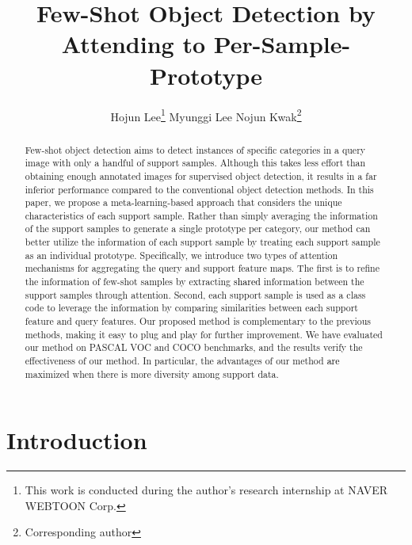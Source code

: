 \documentclass[10pt,twocolumn,letterpaper]{article}
\newcommand{\nj}[1]{\textcolor{black}{#1}}
\newcommand{\hj}[1]{\textcolor{black}{#1}}
\begin{document}
\title{Few-Shot Object Detection  by Attending to Per-Sample-Prototype}



\author[ ]{Hojun Lee\thanks{This work is conducted during the author’s research internship at NAVER WEBTOON Corp. \hspace{-0.5cm}} \:\: Myunggi Lee \:\: Nojun Kwak\thanks{Corresponding author}}


\maketitle


\begin{abstract} \vspace{-0.2cm}
Few-shot object detection aims to detect instances of specific categories in a query image with only a handful of support samples. Although this takes less effort than obtaining enough annotated images for supervised object detection, it results in a far inferior performance compared to the conventional object detection methods. In this paper, we propose a meta-learning-based approach that considers the unique characteristics of each support sample. 
Rather than simply averaging the information of the support samples to generate a single prototype per category, our method can better utilize the information of each support sample by treating each support sample as an individual prototype.
Specifically, we introduce two types of attention mechanisms for aggregating the query and support feature maps. The first is to refine the information of few-shot samples by extracting \nj{shared} information between the support samples through attention. Second, each support sample is used as a class code to leverage the information by comparing similarities between each support feature and query features. Our proposed method is complementary to the previous methods, making it easy to plug and play for further improvement. We have evaluated our method on PASCAL VOC and COCO benchmarks, and the results verify the effectiveness of our method. In particular, the advantages of our method \hj{are} maximized when there is more diversity among support data.
\end{abstract}\vspace{-0.4cm}

\section{Introduction} \vspace{-0.05cm}
\end{document}
